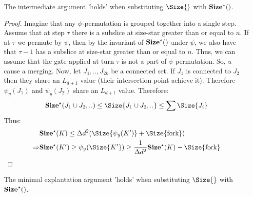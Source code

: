 



\begin{claim}
  The intermediate argument 'holds' when substituting $\Size{ }$ with $\mathbf{Size}^{\star}(   )$. 
\end{claim}
\begin{proof}
  Imagine that any $\psi$-permutation is grouped together into a single step. Assume that at step $\tau$ there is a subslice at size-star greater than or equal to $n$. If at $\tau$ we permute by $\psi$, then by the invariant of $\mathbf{Size}^{\star}(  )$ under $\psi$, we also have that $\tau -1$ has a subslice at size-star greater than or equal to $n$. Thus, we can assume that the gate applied at turn $\tau$ is not a part of $\psi$-permutation. So, $u$ cause a merging. 
  Now, let $J_{1},..,J_{2k}$ be a connected set. If $J_{1}$ is connected to $J_{2}$ then they share an $L_{d+1}$ value (their intersection point achieve it). Therefore $\psi_{y}(J_{1})$ and $\psi_{y}(J_{2})$ share an $L_{d+1}$ value. Therefore: 
  \begin{equation*}
    \begin{split}
      \Sizestar{ J_{1} \cup J_{2} ,..    } \le \Size{ J_{1} \cup J_{2} ,..    } \le \sum \Size{ J_{i} } 
    \end{split}
  \end{equation*}
  Thus:
\begin{equation*}
  \begin{split}
    & \Sizestar{K}  \le \Delta d^{2} ( \Size{ \psi_{y}(K^{\prime}) } +  \Size{\text{fork}} ) \\
    \Rightarrow &  \Sizestar{ K^{\prime} } \ge  \psi_{y}(\Size{K^{\prime}}) \ge \frac{1}{\Delta d^{2}} \Sizestar{K} - \Size{ \text{fork} }
   \end{split}
\end{equation*}
\end{proof}



\begin{claim}
  The minimal explantation argument 'holds' when substituting $\Size{ }$ with $\mathbf{Size}^{\star}(   )$. 
\end{claim}

